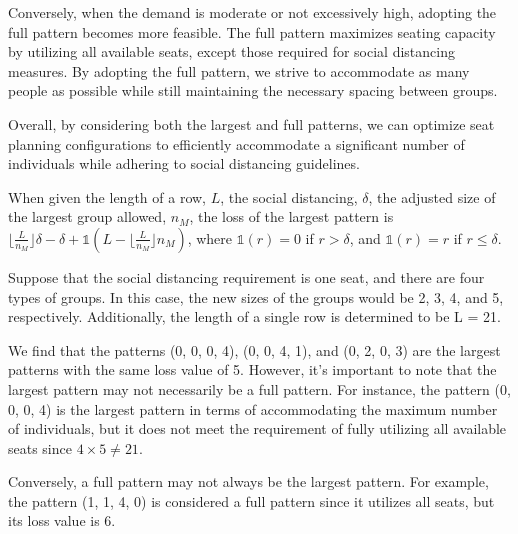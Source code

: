 Conversely, when the demand is moderate or not excessively high, adopting the full pattern becomes more feasible. The full pattern maximizes seating capacity by utilizing all available seats, except those required for social distancing measures. By adopting the full pattern, we strive to accommodate as many people as possible while still maintaining the necessary spacing between groups.

Overall, by considering both the largest and full patterns, we can optimize seat planning configurations to efficiently accommodate a significant number of individuals while adhering to social distancing guidelines.

\begin{lem}\label{lem_pattern}
  When given the length of a row, $L$, the social distancing, $\delta$, the adjusted size of the largest group allowed, $n_M$, the loss of the largest pattern is $\lfloor \frac{L}{n_M} \rfloor \delta - \delta + \mathbb{1}(L - \lfloor \frac{L}{n_M} \rfloor n_M)$, where $\mathbb{1}(r)=0$ if $r> \delta$, and $\mathbb{1}(r)= r$ if $r \leq \delta$.
\end{lem}

\begin{example}
  Suppose that the social distancing requirement is one seat, and there are four types of groups. In this case, the new sizes of the groups would be 2, 3, 4, and 5, respectively. Additionally, the length of a single row is determined to be L = 21. 
  
  We find that the patterns (0, 0, 0, 4), (0, 0, 4, 1), and (0, 2, 0, 3) are the largest patterns with the same loss value of 5. However, it's important to note that the largest pattern may not necessarily be a full pattern. For instance, the pattern (0, 0, 0, 4) is the largest pattern in terms of accommodating the maximum number of individuals, but it does not meet the requirement of fully utilizing all available seats since $4 \times 5 \neq 21$.
  
  Conversely, a full pattern may not always be the largest pattern. For example, the pattern (1, 1, 4, 0) is considered a full pattern since it utilizes all seats, but its loss value is 6.
\end{example}



